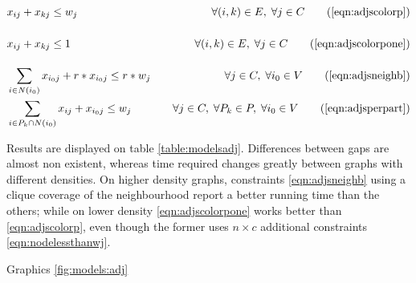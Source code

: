 \begin{align*}
&x_{ij} + x_{kj} \leq w_j \sumheight &\quad \forall (i,k) \in E, \; \forall j \in C \tag{\ref{eqn:adjscolorp}} \\
&x_{ij} + x_{kj} \leq 1 \sumheight &\quad \forall (i,k) \in E, \; \forall j \in C \tag{\ref{eqn:adjscolorpone}} \\
&\sum_{i \in N(i_0)} x_{i_0j} + r * x_{i_0j} \leq r * w_j &\quad \forall j \in C, \; \forall i_0 \in V \tag{\ref{eqn:adjsneighb}} \\
&\sum_{i \in P_k \cap N(i_0)} x_{ij} + x_{i_0j} \leq w_j &\quad \forall j \in C, \; \forall P_k \in P, \; \forall i_0 \in V \tag{\ref{eqn:adjsperpart}} 
\end{align*}

Results are displayed on table \ref{table:modelsadj}. Differences between gaps are almost non existent, whereas time required changes greatly between graphs with different densities. On higher density graphs, constraints \ref{eqn:adjsneighb} using a clique coverage of the neighbourhood report a better running time than the others; while on lower density \ref{eqn:adjscolorpone} works better than \ref{eqn:adjscolorp}, even though the former uses $n \times c$ additional constraints \ref{eqn:nodelessthanwj}.

Graphics \ref{fig:models:adj} 

